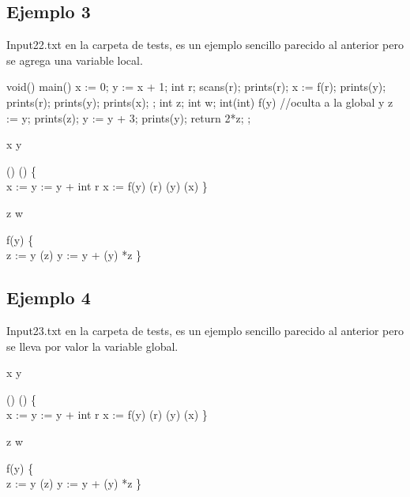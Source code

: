 \newpage

\subsection{Ejemplo 3}
Input22.txt en la carpeta de tests, es un ejemplo sencillo parecido al anterior pero se agrega una variable local.

void() main(){
    x := 0;
    y := x + 1;
    int r;
    scans(r);
    prints(r);
    x := f(r);
    prints(y);
    prints(r);
    prints(y);
    prints(x);
};
int z;
int w;
int(int) f(y){ //oculta a la global y
    z := y;
    prints(z);
    y := y + 3;
    prints(y);
    return 2*z;
};
\begin{algorithm}

	\Integer{} x  \;
	\Integer{} y  \;
	
	\Void() () \{ \\
	\quad x :=  \;
	\quad y := y + \;
	\quad int r\;
	\quad x := f(y)\;
	\quad {}(r)\;
	\quad {}(y)\;
	\quad {}(x)\;
	\}\;

 	\Integer{} z \;
	\Integer{} w \;
	
	 f(y) \{ \\
	\quad z := y \;
	\quad {}(z) \;
	\quad y := y +  \;
	\quad {}(y) \;
	\quad {} *z \;
	\}\;
	
\end{algorithm}

\newpage

\subsection{Ejemplo 4}
Input23.txt en la carpeta de tests, es un ejemplo sencillo parecido al anterior pero se lleva por valor la variable global.

\begin{algorithm}

	\Integer{} x  \;
	\Integer{} y  \;
	
	\Void() () \{ \\
	\quad x :=  \;
	\quad y := y + \;
	\quad int r\;
	\quad x := f(y)\;
	\quad {}(r)\;
	\quad {}(y)\;
	\quad {}(x)\;
	\}\;

 	\Integer{} z \;
	\Integer{} w \;
	
	 f(y) \{ \\
	\quad z := y \;
	\quad {}(z) \;
	\quad y := y +  \;
	\quad {}(y) \;
	\quad {} *z \;
	\}\;
	
\end{algorithm}


